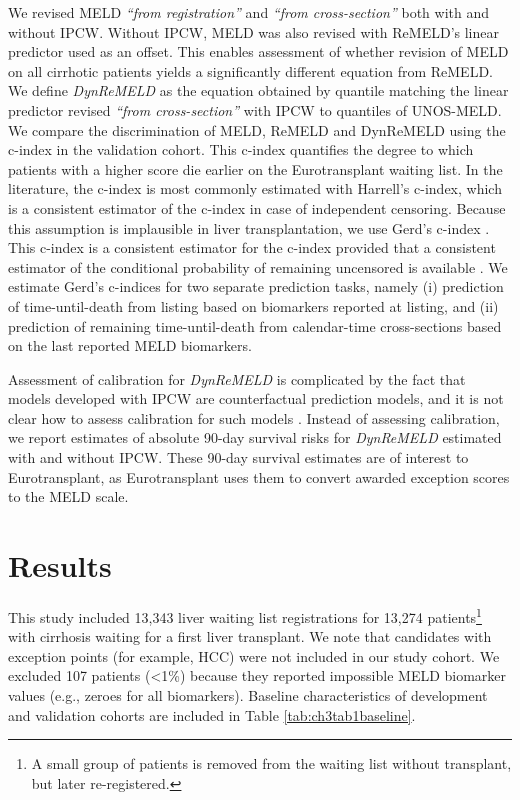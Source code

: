 \documentclass[11pt,twoside,]{book}
\let\rmarkdownfootnote\footnote%
\def\footnote{\protect\rmarkdownfootnote}
\begin{document}
We revised MELD \emph{``from registration''} and \emph{``from cross-section''} both
with and without IPCW. Without IPCW, MELD was also revised with ReMELD's
linear predictor used as an offset. This enables assessment of whether
revision of MELD on all cirrhotic patients yields a significantly
different equation from ReMELD. We define \emph{DynReMELD} as the equation
obtained by quantile matching the linear predictor revised \emph{``from
cross-section''} with IPCW to quantiles of UNOS-MELD.
\newpage
We compare the discrimination of MELD, ReMELD and DynReMELD using the c-index
in the validation cohort. This c-index quantifies the degree to which patients with a
higher score die earlier on the Eurotransplant waiting list. In the literature,
the c-index is most commonly estimated with Harrell's c-index, which is a
consistent estimator of the c-index in case of independent censoring. Because
this assumption is implausible in liver transplantation, we use Gerd's c-index \citep{gerdsEstimatingTimedependentConcordance2012}.
This c-index is a consistent estimator for the c-index provided that a consistent
estimator of the conditional probability of remaining uncensored is available
\citep{gerdsEstimatingTimedependentConcordance2012, Hartman2025}.
We estimate Gerd's c-indices for two separate prediction tasks,
namely (i) prediction of time-until-death from listing based on biomarkers
reported at listing,
and (ii) prediction of remaining time-until-death from calendar-time
cross-sections based on the last reported MELD biomarkers.

Assessment of calibration for \emph{DynReMELD} is complicated by the fact
that models developed with IPCW are counterfactual prediction models,
and it is not clear how to assess calibration for such models
\citep{linScopingReviewCausal2021}. Instead of assessing calibration, we report estimates
of absolute 90-day survival risks for \emph{DynReMELD} estimated with and
without IPCW. These 90-day survival estimates are of interest to Eurotransplant,
as Eurotransplant uses them to convert awarded exception scores to the MELD scale.

\section{Results}\label{results}

This study included 13,343 liver waiting list registrations for 13,274
patients\footnote{A small group of patients is removed from the waiting list without
  transplant, but later re-registered.} with cirrhosis waiting for a first
liver transplant. We note that candidates with exception points (for example,
HCC) were not included in our study cohort. We excluded 107 patients (\textless1\%)
because they reported impossible MELD biomarker values (e.g., zeroes for all
biomarkers). Baseline characteristics of development and validation cohorts
are included in Table \ref{tab:ch3tab1baseline}.
\end{document}
